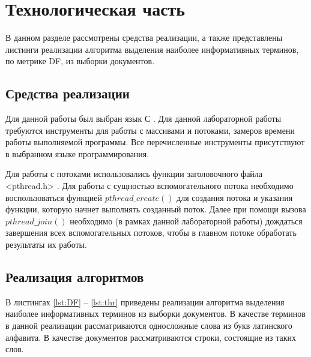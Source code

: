 \chapter{Технологическая часть}
В данном разделе рассмотрены средства реализации, а также представлены листинги реализации алгоритма выделения наиболее информативных терминов, по метрике DF, из выборки документов.

\section{Средства реализации}
Для данной работы был выбран язык С \cite{c-lang}. Для данной лабораторной работы требуются инструменты для работы с массивами и потоками, замеров времени работы выполняемой программы. Все перечисленные инструменты присутствуют в выбранном языке программирования.

Для работы с потоками использовались функции заголовочного файла <pthread.h> \cite{pthread}. Для работы с сущностью вспомогательного потока необходимо воспользоваться функцией $pthread\_create()$ для создания потока и указания функции, которую начнет выполнять созданный поток. Далее при помощи вызова $pthread\_join()$ необходимо (в рамках данной лабораторной работы) дождаться  завершения всех вспомогательных потоков, чтобы в главном потоке обработать результаты их работы.


\section{Реализация алгоритмов}
В листингах \ref{lst:DF} -- \ref{lst:thr} приведены реализации алгоритма выделения наиболее информативных терминов из выборки документов.
В качестве терминов в данной реализации рассматриваются односложные слова из букв латинского алфавита. В качестве документов рассматриваются строки, состоящие из таких слов.

